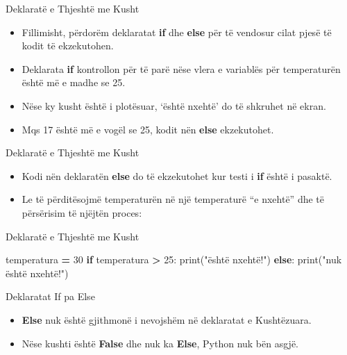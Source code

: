 \documentclass[
  ignorenonframetext,
]{beamer}
\newenvironment{Shaded}{\begin{snugshade}}{\end{snugshade}}
\newcommand{\BuiltInTok}[1]{#1}
\newcommand{\ControlFlowTok}[1]{\textcolor[rgb]{0.13,0.29,0.53}{\textbf{#1}}}
\newcommand{\DecValTok}[1]{\textcolor[rgb]{0.00,0.00,0.81}{#1}}
\newcommand{\NormalTok}[1]{#1}
\newcommand{\OperatorTok}[1]{\textcolor[rgb]{0.81,0.36,0.00}{\textbf{#1}}}
\newcommand{\StringTok}[1]{\textcolor[rgb]{0.31,0.60,0.02}{#1}}
\begin{document}
\begin{frame}{Deklaratë e Thjeshtë me Kusht}
\protect\hypertarget{deklaratuxeb-e-thjeshtuxeb-me-kusht-1}{}
\begin{itemize}
\item
  Fillimisht, përdorëm deklaratat \textbf{if} dhe \textbf{else} për të
  vendosur cilat pjesë të kodit të ekzekutohen.
\item
  Deklarata \textbf{if} kontrollon për të parë nëse vlera e variablës
  për temperaturën është më e madhe se 25.
\item
  Nëse ky kusht është i plotësuar, `është nxehtë' do të shkruhet në
  ekran.
\item
  Mqs 17 është më e vogël se 25, kodit nën \textbf{else} ekzekutohet.
\end{itemize}
\end{frame}

\begin{frame}{Deklaratë e Thjeshtë me Kusht}
\protect\hypertarget{deklaratuxeb-e-thjeshtuxeb-me-kusht-2}{}
\begin{itemize}
\item
  Kodi nën deklaratën \textbf{else} do të ekzekutohet kur testi i
  \textbf{if} është i pasaktë.
\item
  Le të përditësojmë temperaturën në një temperaturë ``e nxehtë'' dhe të
  përsërisim të njëjtën proces:
\end{itemize}
\end{frame}

\begin{frame}[fragile]{Deklaratë e Thjeshtë me Kusht}
\protect\hypertarget{deklaratuxeb-e-thjeshtuxeb-me-kusht-3}{}
\begin{Shaded}
\begin{Highlighting}[]
\NormalTok{temperatura }\OperatorTok{=} \DecValTok{30}
\ControlFlowTok{if}\NormalTok{ temperatura }\OperatorTok{\textgreater{}} \DecValTok{25}\NormalTok{:}
    \BuiltInTok{print}\NormalTok{(}\StringTok{"është nxehtë!"}\NormalTok{)}
\ControlFlowTok{else}\NormalTok{:}
    \BuiltInTok{print}\NormalTok{(}\StringTok{"nuk është nxehtë!"}\NormalTok{)}
\end{Highlighting}
\end{Shaded}
\end{frame}

\begin{frame}{Deklaratat If pa Else}
\protect\hypertarget{deklaratat-if-pa-else}{}
\begin{itemize}
\item
  \textbf{Else} nuk është gjithmonë i nevojshëm në deklaratat e
  Kushtëzuara.
\item
  Nëse kushti është \textbf{False} dhe nuk ka \textbf{Else}, Python nuk
  bën asgjë.
\end{itemize}
\end{frame}
\end{document}
